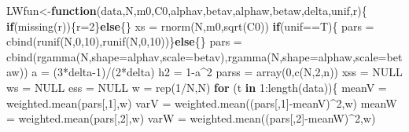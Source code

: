 \documentclass[
]{book}
\newenvironment{Shaded}{\begin{snugshade}}{\end{snugshade}}
\newcommand{\AttributeTok}[1]{\textcolor[rgb]{0.77,0.63,0.00}{#1}}
\newcommand{\ConstantTok}[1]{\textcolor[rgb]{0.00,0.00,0.00}{#1}}
\newcommand{\ControlFlowTok}[1]{\textcolor[rgb]{0.13,0.29,0.53}{\textbf{#1}}}
\newcommand{\DecValTok}[1]{\textcolor[rgb]{0.00,0.00,0.81}{#1}}
\newcommand{\FunctionTok}[1]{\textcolor[rgb]{0.00,0.00,0.00}{#1}}
\newcommand{\NormalTok}[1]{#1}
\newcommand{\OtherTok}[1]{\textcolor[rgb]{0.56,0.35,0.01}{#1}}
\newcommand{\SpecialCharTok}[1]{\textcolor[rgb]{0.00,0.00,0.00}{#1}}
\theoremstyle{break}
\theoremstyle{nonumberplain}
\begin{document}
\begin{Shaded}
\begin{Highlighting}[]
\NormalTok{LWfun}\OtherTok{\textless{}{-}}\ControlFlowTok{function}\NormalTok{(data,N,m0,C0,alphav,betav,alphaw,betaw,delta,unif,r)\{}
  \ControlFlowTok{if}\NormalTok{(}\FunctionTok{missing}\NormalTok{(r))\{r}\OtherTok{=}\DecValTok{2}\NormalTok{\}}\ControlFlowTok{else}\NormalTok{\{\}}
\NormalTok{  xs     }\OtherTok{=} \FunctionTok{rnorm}\NormalTok{(N,m0,}\FunctionTok{sqrt}\NormalTok{(C0))}
  \ControlFlowTok{if}\NormalTok{(unif}\SpecialCharTok{==}\NormalTok{T)\{}
\NormalTok{  pars   }\OtherTok{=} \FunctionTok{cbind}\NormalTok{(}\FunctionTok{runif}\NormalTok{(N,}\DecValTok{0}\NormalTok{,}\DecValTok{10}\NormalTok{),}\FunctionTok{runif}\NormalTok{(N,}\DecValTok{0}\NormalTok{,}\DecValTok{10}\NormalTok{))\}}\ControlFlowTok{else}\NormalTok{\{\}}
\NormalTok{  pars   }\OtherTok{=} \FunctionTok{cbind}\NormalTok{(}\FunctionTok{rgamma}\NormalTok{(N,}\AttributeTok{shape=}\NormalTok{alphav,}\AttributeTok{scale=}\NormalTok{betav),}\FunctionTok{rgamma}\NormalTok{(N,}\AttributeTok{shape=}\NormalTok{alphaw,}\AttributeTok{scale=}\NormalTok{betaw))}
\NormalTok{  a      }\OtherTok{=}\NormalTok{ (}\DecValTok{3}\SpecialCharTok{*}\NormalTok{delta}\DecValTok{{-}1}\NormalTok{)}\SpecialCharTok{/}\NormalTok{(}\DecValTok{2}\SpecialCharTok{*}\NormalTok{delta)}
\NormalTok{  h2     }\OtherTok{=} \DecValTok{1}\SpecialCharTok{{-}}\NormalTok{a}\SpecialCharTok{\^{}}\DecValTok{2}
\NormalTok{  parss  }\OtherTok{=} \FunctionTok{array}\NormalTok{(}\DecValTok{0}\NormalTok{,}\FunctionTok{c}\NormalTok{(N,}\DecValTok{2}\NormalTok{,n))}
\NormalTok{  xss    }\OtherTok{=} \ConstantTok{NULL}
\NormalTok{  ws     }\OtherTok{=} \ConstantTok{NULL}
\NormalTok{  ess    }\OtherTok{=} \ConstantTok{NULL}
\NormalTok{  w      }\OtherTok{=} \FunctionTok{rep}\NormalTok{(}\DecValTok{1}\SpecialCharTok{/}\NormalTok{N,N)}
  \ControlFlowTok{for}\NormalTok{ (t }\ControlFlowTok{in} \DecValTok{1}\SpecialCharTok{:}\FunctionTok{length}\NormalTok{(data))\{}
\NormalTok{    meanV }\OtherTok{=} \FunctionTok{weighted.mean}\NormalTok{(pars[,}\DecValTok{1}\NormalTok{],w)}
\NormalTok{    varV  }\OtherTok{=} \FunctionTok{weighted.mean}\NormalTok{((pars[,}\DecValTok{1}\NormalTok{]}\SpecialCharTok{{-}}\NormalTok{meanV)}\SpecialCharTok{\^{}}\DecValTok{2}\NormalTok{,w)}
\NormalTok{    meanW }\OtherTok{=} \FunctionTok{weighted.mean}\NormalTok{(pars[,}\DecValTok{2}\NormalTok{],w)}
\NormalTok{    varW  }\OtherTok{=} \FunctionTok{weighted.mean}\NormalTok{((pars[,}\DecValTok{2}\NormalTok{]}\SpecialCharTok{{-}}\NormalTok{meanW)}\SpecialCharTok{\^{}}\DecValTok{2}\NormalTok{,w)}
    

\end{Highlighting}
\end{Shaded}
\end{document}
